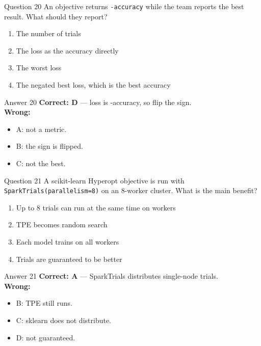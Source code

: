 \documentclass[aspectratio=169,11pt]{beamer}
\begin{document}
\begin{frame}{Question 20}
An objective returns \texttt{-accuracy} while the team reports the best result. What should they report?
\begin{enumerate}[label=\Alph*.]
\item The number of trials
\item The loss as the accuracy directly
\item The worst loss
\item The negated best loss, which is the best accuracy
\end{enumerate}
\end{frame}
\begin{frame}{Answer 20}
\textbf{Correct: D} --- loss is -accuracy, so flip the sign.\\
\vspace{0.5em}
\textbf{Wrong:}
\begin{itemize}
\item A: not a metric.
\item B: the sign is flipped.
\item C: not the best.
\end{itemize}
\end{frame}

\begin{frame}{Question 21}
A scikit-learn Hyperopt objective is run with \texttt{SparkTrials(parallelism=8)} on an 8-worker cluster. What is the main benefit?
\begin{enumerate}[label=\Alph*.]
\item Up to 8 trials can run at the same time on workers
\item TPE becomes random search
\item Each model trains on all workers
\item Trials are guaranteed to be better
\end{enumerate}
\end{frame}
\begin{frame}{Answer 21}
\textbf{Correct: A} --- SparkTrials distributes single-node trials.\\
\vspace{0.5em}
\textbf{Wrong:}
\begin{itemize}
\item B: TPE still runs.
\item C: sklearn does not distribute.
\item D: not guaranteed.
\end{itemize}
\end{frame}
\end{document}
